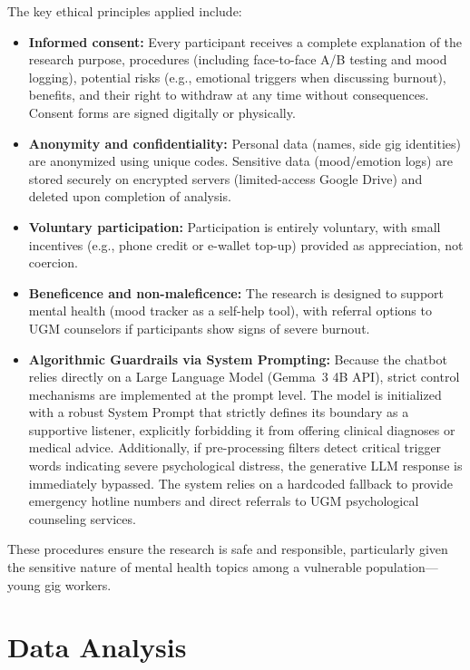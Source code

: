 The key ethical principles applied include:

\begin{itemize}
    \item \textbf{Informed consent:} Every participant receives a complete explanation of the research purpose, procedures (including face-to-face A/B testing and mood logging), potential risks (e.g., emotional triggers when discussing burnout), benefits, and their right to withdraw at any time without consequences. Consent forms are signed digitally or physically.
    \item \textbf{Anonymity and confidentiality:} Personal data (names, side gig identities) are anonymized using unique codes. Sensitive data (mood/emotion logs) are stored securely on encrypted servers (limited-access Google Drive) and deleted upon completion of analysis.
    \item \textbf{Voluntary participation:} Participation is entirely voluntary, with small incentives (e.g., phone credit or e-wallet top-up) provided as appreciation, not coercion.
    \item \textbf{Beneficence and non-maleficence:} The research is designed to support mental health (mood tracker as a self-help tool), with referral options to UGM counselors if participants show signs of severe burnout.
    \item \textbf{Algorithmic Guardrails via System Prompting:} Because the chatbot relies directly on a Large Language Model (Gemma~3 4B API), strict control mechanisms are implemented at the prompt level. The model is initialized with a robust System Prompt that strictly defines its boundary as a supportive listener, explicitly forbidding it from offering clinical diagnoses or medical advice. Additionally, if pre-processing filters detect critical trigger words indicating severe psychological distress, the generative LLM response is immediately bypassed. The system relies on a hardcoded fallback to provide emergency hotline numbers and direct referrals to UGM psychological counseling services.
\end{itemize}

These procedures ensure the research is safe and responsible, particularly given the sensitive nature of mental health topics among a vulnerable population---young gig workers.

\section{Data Analysis}

